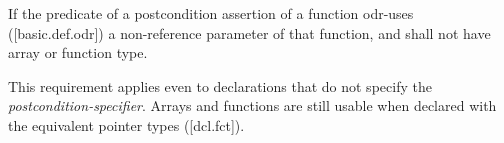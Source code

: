 \begin{adjustwidth}{0.5cm}{0.5cm}
If the predicate of a postcondition assertion of a function odr-uses ([basic.def.odr]) a non-reference parameter of that function,  and shall not have array or function type.

\begin{note}
This requirement applies even to declarations that do not specify the \emph{postcondition-specifier}. Arrays and functions are still usable when declared with the equivalent pointer types ([dcl.fct]).
\end{note}
\end{adjustwidth}




\renewcommand{\addcontentsline}[3]{}%







